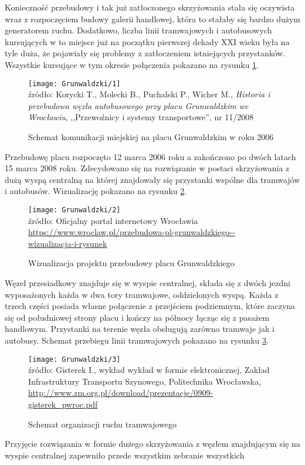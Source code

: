 \documentclass[twoside,12pt]{article}
\begin{document}
	Konieczność przebudowy i tak już zatłoczonego skrzyżowania stała się oczywista wraz z rozpoczęciem budowy galerii handlowej, która to stałaby się bardzo dużym generatorem ruchu. Dodatkowo, liczba linii tramwajowych i autobusowych kursujących w to miejsce już na początku pierwszej dekady XXI wieku była na tyle duża, że pojawiały się problemy z zatłoczeniem istniejących przystanków. Wszystkie kursujące w tym okresie połączenia pokazano na rysunku \ref{grunwaldzki1}.
	
	\begin{figure}[H]
		\centering
		\caption{Schemat komunikacji miejskiej na placu Grunwaldzkim w roku 2006}
		\texttt{[image: Grunwaldzki/1]}\\
		\footnotesize{źródło: Korycki T., Molecki B., Puchalski P., Wicher M., \emph{Historia i przebudowa węzła autobusowego przy placu Grunwaldzkim we Wrocławiu}, ,,Przewoźnicy i systemy transportowe'', nr 11/2008 \cite{grunwaldzki1}}
		\label{grunwaldzki1}
	\end{figure}
	
	Przebudowę placu rozpoczęto 12 marca 2006 roku a zakończono po dwóch latach 15 marca 2008 roku. Zdecydowano się na rozwiązanie w postaci skrzyżowania z dużą wyspą centralną na której znajdowały się przystanki wspólne dla tramwajów i autobusów. Wizualizację pokazano na rysunku \ref{grunwaldzki2}. 
	
	\begin{figure}[H]
		\centering
		\caption{Wizualizacja projektu przebudowy placu Grunwaldzkiego}
		\texttt{[image: Grunwaldzki/2]}\\
		\footnotesize{źródło: Oficjalny portal internetowy Wrocławia %
		\url{https://www.wroclaw.pl/przebudowa-pl-grunwaldzkiego--wizualizacja-i-rysunek}}
		\label{grunwaldzki2}
	\end{figure}	
	
	Węzeł przesiadkowy znajduje się w wyspie centralnej, składa się z dwóch jezdni wyposażonych każda w dwa tory tramwajowe, oddzielonych wyspą. Każda z trzech części posiada własne połączenie z przejściem podziemnym, które zaczyna się od południowej strony placu i kończy na północy łącząc się z pasażem handlowym. Przystanki na terenie węzła obsługują zarówno tramwaje jak i autobusy. Schemat przebiegu linii tramwajowych pokazano na rysunku \ref{grunwaldzki3}.
	
	\begin{figure}[H]
		\centering
		\caption{Schemat organizacji ruchu tramwajowego}
		\texttt{[image: Grunwaldzki/3]}\\
		\footnotesize{źródło: Gisterek I., wykład wykład w formie elektronicznej, Zakład Infrastruktury Transportu Szynowego, Politechnika Wrocławska, \url{http://www.zm.org.pl/download/prezentacje/0909-gisterek_pwroc.pdf} \cite{grunwaldzki2}}
		\label{grunwaldzki3}
	\end{figure}	
	
	Przyjęcie rozwiązania w formie dużego skrzyżowania z węzłem znajdującym się na wyspie centralnej zapewniło przede wszystkim zebranie wszystkich 

	


\clearpage

\end{document}
